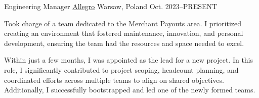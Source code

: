 
\begin{cventries}

  \cventry
  {Engineering Manager} %
  {\href{https://allegro.pl}{Allegro}} %
  {Warsaw, Poland} %
  {Oct. 2023–PRESENT} %
  {
    \begin {cvitems} %
      \item {Took charge of a team dedicated to the Merchant Payouts area. I prioritized creating an environment that fostered maintenance, innovation, and personal development, ensuring the team had the resources and space needed to excel.}
      \item {Within just a few months, I was appointed as the lead for a new project. In this role, I significantly contributed to project scoping, headcount planning, and coordinated efforts across multiple teams to align on shared objectives. Additionally, I successfully bootstrapped and led one of the newly formed teams.}
    \end {cvitems}
  }


\end{cventries}
